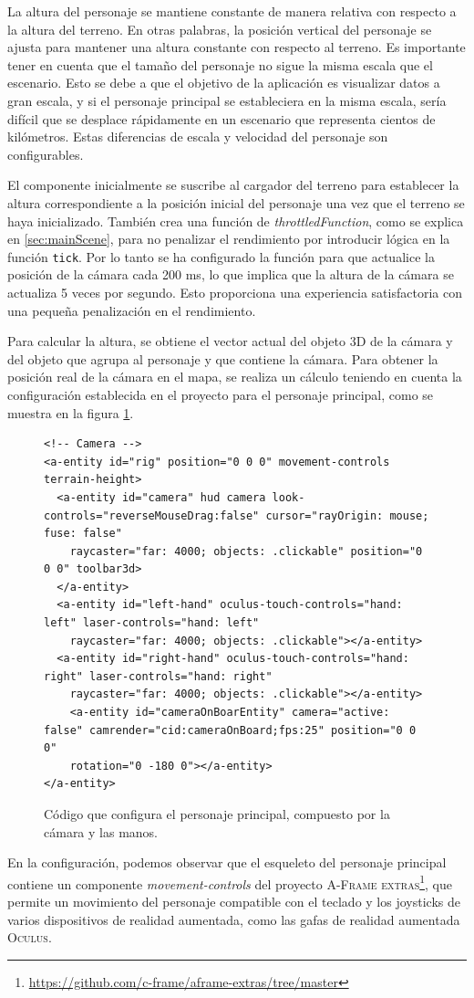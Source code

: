 \documentclass[a4paper, 11pt]{book}
\begin{document}
La altura del personaje se mantiene constante de manera relativa con respecto a la altura del terreno. En otras palabras, la posición vertical del personaje se ajusta para mantener una altura constante con respecto al terreno.
Es importante tener en cuenta que el tamaño del personaje no sigue la misma escala que el escenario. Esto se debe a que el objetivo de la aplicación es visualizar datos a gran escala, y si el personaje principal se estableciera en la misma escala, sería difícil que se desplace rápidamente en un escenario que representa cientos de kilómetros. Estas diferencias de escala y velocidad del personaje son configurables.

El componente inicialmente se suscribe al cargador del terreno para establecer la altura correspondiente a la posición inicial del personaje una vez que el terreno se haya inicializado. También crea una función de \emph{throttledFunction}, como se explica en \ref{sec:mainScene}, para no penalizar el rendimiento por introducir lógica en la función \texttt{tick}. Por lo tanto se ha configurado la función para que actualice la posición de la cámara cada 200 ms, lo que implica que la altura de la cámara se actualiza 5 veces por segundo. Esto proporciona una experiencia satisfactoria con una pequeña penalización en el rendimiento.

Para calcular la altura, se obtiene el vector actual del objeto 3D de la cámara y del objeto que agrupa al personaje y que contiene la cámara. Para obtener la posición real de la cámara en el mapa, se realiza un cálculo teniendo en cuenta la configuración establecida en el proyecto para el personaje principal, como se muestra en la figura \ref{codigo:rig}.\\
\begin{figure}[h]
\centering
\begin{verbatim}
<!-- Camera -->
<a-entity id="rig" position="0 0 0" movement-controls terrain-height>
  <a-entity id="camera" hud camera look-controls="reverseMouseDrag:false" cursor="rayOrigin: mouse; fuse: false"
    raycaster="far: 4000; objects: .clickable" position="0 0 0" toolbar3d>
  </a-entity>
  <a-entity id="left-hand" oculus-touch-controls="hand: left" laser-controls="hand: left"
    raycaster="far: 4000; objects: .clickable"></a-entity>
  <a-entity id="right-hand" oculus-touch-controls="hand: right" laser-controls="hand: right"
    raycaster="far: 4000; objects: .clickable"></a-entity>
    <a-entity id="cameraOnBoarEntity" camera="active: false" camrender="cid:cameraOnBoard;fps:25" position="0 0 0"
    rotation="0 -180 0"></a-entity>
</a-entity>
\end{verbatim}
\caption{Código que configura el personaje principal, compuesto por la cámara y las manos.
\label{codigo:rig}
}
\end{figure}
En la configuración, podemos observar que el esqueleto del personaje principal contiene un componente \emph{movement-controls} del proyecto \textsc{A-Frame extras}\footnote{\url{https://github.com/c-frame/aframe-extras/tree/master}}, que permite un movimiento del personaje compatible con el teclado y los joysticks de varios dispositivos de realidad aumentada, como las gafas de realidad aumentada \textsc{Oculus}.
\end{document}
